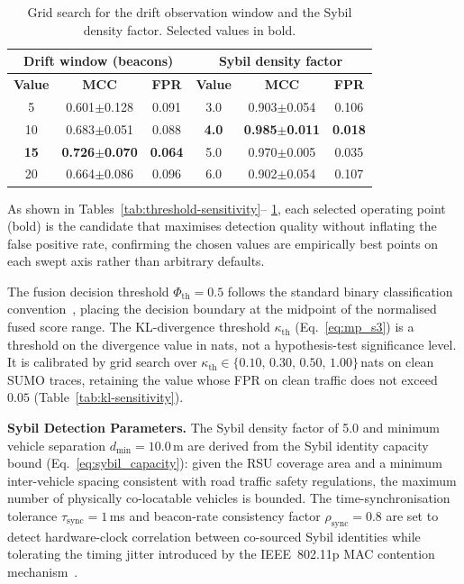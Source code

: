 \documentclass[12pt, a4paper]{report}
\begin{document}
\begin{table}[H]
\centering
\caption{Grid search for the drift observation window and the Sybil density
factor. Selected values in bold.}
\label{tab:window-sybil-sensitivity}
\renewcommand{\arraystretch}{1.2}
\begin{tabular}{|c|c|c|c|c|c|}
\hline
\multicolumn{3}{|c|}{\textbf{Drift window (beacons)}} &
\multicolumn{3}{c|}{\textbf{Sybil density factor}} \\
\hline
\textbf{Value} & \textbf{MCC} & \textbf{FPR} &
\textbf{Value} & \textbf{MCC} & \textbf{FPR} \\
\hline
5            & 0.601$\pm$0.128 & 0.091 & 3.0          & 0.903$\pm$0.054 & 0.106 \\
\hline
10           & 0.683$\pm$0.051 & 0.088 & \textbf{4.0} & \textbf{0.985$\pm$0.011} & \textbf{0.018} \\
\hline
\textbf{15}  & \textbf{0.726$\pm$0.070} & \textbf{0.064} & 5.0          & 0.970$\pm$0.005 & 0.035 \\
\hline
20           & 0.664$\pm$0.086 & 0.096 & 6.0          & 0.902$\pm$0.054 & 0.107 \\
\hline
\end{tabular}
\end{table}

As shown in Tables~\ref{tab:threshold-sensitivity}--%
\ref{tab:window-sybil-sensitivity}, each selected operating point (bold) is
the candidate that maximises detection quality without inflating the false
positive rate, confirming the chosen values are empirically best points on
each swept axis rather than arbitrary defaults.


The fusion decision threshold
$\Phi_{\mathrm{th}} = 0.5$ follows the standard binary
classification convention~\cite{raja2021}, placing the decision
boundary at the midpoint of the normalised fused score range.
The KL-divergence threshold $\kappa_{\mathrm{th}}$
(Eq.~\ref{eq:mp_s3}) is a threshold on the divergence
value in nats, not a hypothesis-test significance level.
It is calibrated by grid search over
$\kappa_{\mathrm{th}} \in \{0.10,\,0.30,\,0.50,\,1.00\}$\,nats
on clean SUMO traces, retaining the value whose FPR on
clean traffic does not exceed $0.05$
(Table~\ref{tab:kl-sensitivity}).

\textbf{Sybil Detection Parameters.}
The Sybil density factor of 5.0 and minimum vehicle separation
$d_{\min} = 10.0$\,m are derived from the Sybil identity capacity
bound (Eq.~\ref{eq:sybil_capacity}): given the RSU coverage area
and a minimum inter-vehicle spacing consistent with road traffic
safety regulations, the maximum number of physically co-locatable
vehicles is bounded. The time-synchronisation tolerance
$\tau_{\mathrm{sync}} = 1$\,ms and beacon-rate consistency factor
$\rho_{\mathrm{sync}} = 0.8$ are set to detect hardware-clock
correlation between co-sourced Sybil identities while tolerating
the timing jitter introduced by the IEEE~802.11p MAC contention
mechanism~\cite{ieee80211p2010}.
\end{document}
